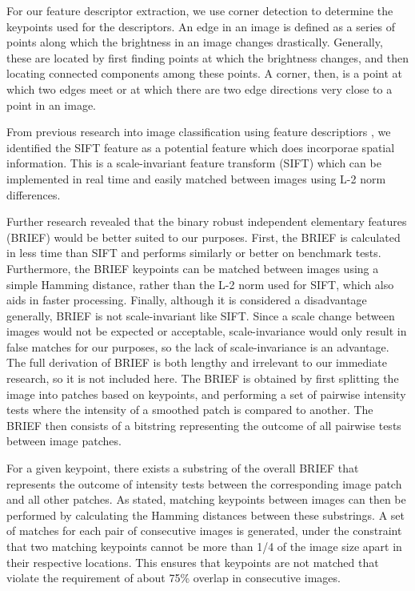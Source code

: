 For our feature descriptor extraction, we use corner detection to determine the keypoints used for the descriptors.
An edge in an image is defined as a series of points along which the brightness in an image changes drastically.
Generally, these are located by first finding points at which the brightness changes, and then locating connected components among these points.
A corner, then, is a point at which two edges meet or at which there are two edge directions very close to a point in an image.


From previous research into image classification using feature descriptiors \cite{anomalyhyper}, we identified the SIFT feature as a potential feature which does incorporae spatial information.
This is a scale-invariant feature transform (SIFT) which can be implemented in real time and easily matched between images using L-2 norm differences.


Further research revealed that the binary robust independent elementary features (BRIEF) would be better suited to our purposes.
First, the BRIEF is calculated in less time than SIFT and performs similarly or better on benchmark tests.
Furthermore, the BRIEF keypoints can be matched between images using a simple Hamming distance, rather than the L-2 norm used for SIFT, which also aids in faster processing.
Finally, although it is considered a disadvantage generally, BRIEF is not scale-invariant like SIFT.
Since a scale change between images would not be expected or acceptable, scale-invariance would only result in false matches for our purposes, so the lack of scale-invariance is an advantage.
The full derivation of BRIEF is both lengthy and irrelevant to our immediate research, so it is not included here.
The BRIEF is obtained by first splitting the image into patches based on keypoints, and performing a set of pairwise intensity tests where the intensity of a smoothed patch is compared to another. 
The BRIEF then consists of a bitstring representing the outcome of all pairwise tests between image patches.

For a given keypoint, there exists a substring of the overall BRIEF that represents the outcome of intensity tests between the corresponding image patch and all other patches.
As stated, matching keypoints between images can then be performed by calculating the Hamming distances between these substrings.
A set of matches for each pair of consecutive images is generated, under the constraint that two matching keypoints cannot be more than 1/4 of the image size apart in their respective locations.
This ensures that keypoints are not matched that violate the requirement of about 75\% overlap in consecutive images.

